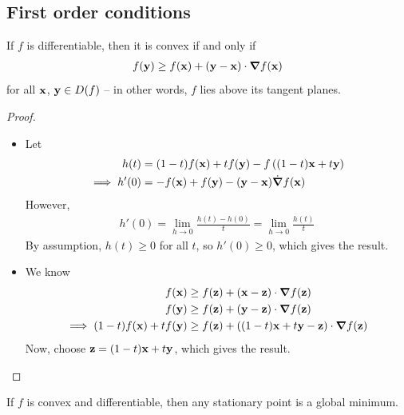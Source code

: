 \documentclass{../../template/note}
\begin{document}
    \subsection{First order conditions}

    \begin{theorem}
        \label{first-order-condition}
        If $f$ is differentiable, then it is convex if and only if
        \begin{align*}
            f(\V y) \geq f(\V x) + (\V y - \V x) \cdot \grad f(\V x)
        \end{align*}
        for all $\V x$, $\V y \in D(f)$ -- in other words, $f$ lies above its tangent planes.        
    \end{theorem}

    \begin{proof}
        \begin{itemize}
            \item[$\implies$] Let
            \begin{align*}
                h(t) &= (1-t)f(\V x) + tf(\V y) - f\left((1-t)\V x + t\V y\right) \\
                \implies h'(0) &= -f(\V x) + f(\V y) - (\V y - \V x) \dot \grad f(\V x)
            \end{align*}
            However,
            \begin{align*}
                h'(0) = \lim_{h \to 0} \frac{h(t)-h(0)}{t} = \lim_{h \to 0} \frac{h(t)}{t}
            \end{align*}
            By assumption, $h(t) \geq 0$ for all $t$, so $h'(0) \geq 0$, which gives the result.
            \item[$\impliedby$] We know
            \begin{align*}
                f(\V x) &\geq f(\V z) + (\V x - \V z) \cdot \grad f(\V z) \\
                f(\V y) &\geq f(\V z) + (\V y - \V z) \cdot \grad f(\V z) \\
                \implies (1-t)f(\V x) + tf(\V y) &\geq f(\V z) + \left((1-t)\V x + t\V y - \V z\right)\cdot \grad f(\V z)
            \end{align*}
            Now, choose $\V z = (1-t)\V x + t\V y$, which gives the result.
        \end{itemize}
    \end{proof}
    
    \begin{corollary}
        If $f$ is convex and differentiable, then any stationary point is a global minimum.
    \end{corollary}
    
\end{document}
